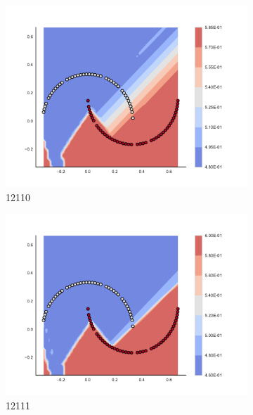 \begin{figure}[h]
\begin{subfigure}[b]{0.09\textwidth}
    \includegraphics[clip, trim=2.35cm 1.75cm 4.5cm 0cm,width=\textwidth]{img/convergence/12110.pdf}
    \caption{12110}
    \label{fig:convergence_12110}
\end{subfigure}
%
\begin{subfigure}[b]{0.09\textwidth}
    \includegraphics[clip, trim=2.35cm 1.75cm 4.5cm 0cm,width=\textwidth]{img/convergence/12111.pdf}
    \caption{12111}
    \label{fig:convergence_12111}
\end{subfigure}
%
\begin{subfigure}[b]{0.09\textwidth}

\end{subfigure}
\end{figure}
